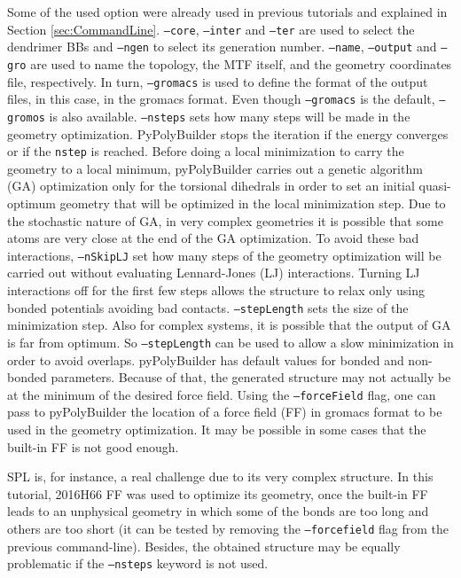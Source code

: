 Some of the used option were already used in previous tutorials and explained in Section \ref{sec:CommandLine}.
\texttt{--core}, \texttt{--inter} and \texttt{--ter} are used to select the dendrimer BBs and \texttt{--ngen} to select its generation number.
\texttt{--name}, \texttt{--output} and \texttt{--gro} are used to name the topology, the MTF itself, and the geometry coordinates file, respectively.
In turn, \texttt{--gromacs} is used to define the format of the output files, in this case, in the gromacs format.
Even though \texttt{--gromacs} is the default, \texttt{--gromos} is also available.
\texttt{--nsteps} sets how many steps will be made in the geometry optimization.
PyPolyBuilder stops the iteration if the energy converges or if the \texttt{nstep} is reached.
Before doing a local minimization to carry the geometry to a local minimum, pyPolyBuilder carries out a genetic algorithm (GA) optimization only for the torsional dihedrals in order to set an initial quasi-optimum geometry that will be optimized in the local minimization step.
Due to the stochastic nature of GA, in very complex geometries it is possible that some atoms are very close at the end of the GA optimization.
To avoid these bad interactions, \texttt{--nSkipLJ} set how many steps of the geometry optimization will be carried out without evaluating Lennard-Jones (LJ) interactions.
Turning LJ interactions off for the first few steps allows the structure to relax only using bonded potentials avoiding bad contacts.
\texttt{--stepLength} sets the size of the minimization step.
Also for complex systems, it is possible that the output of GA is far from optimum.
So \texttt{--stepLength} can be used to allow a slow minimization in order to avoid overlaps.
pyPolyBuilder has default values for bonded and non-bonded parameters.
Because of that, the generated structure may not actually be at the minimum of the desired force field.
Using the \texttt{--forceField} flag, one can pass to pyPolyBuilder the location of a force field (FF) in gromacs format to be used in the geometry optimization. 
It may be possible in some cases that the built-in FF is not good enough.

SPL is, for instance, a real challenge due to its very complex structure.
In this tutorial, 2016H66 FF was used to optimize its geometry, once the built-in FF leads to an unphysical geometry in which some of the bonds are too long and others are too short (it can be tested by removing the \texttt{--forcefield} flag from the previous command-line).
Besides, the obtained structure may be equally problematic if the \texttt{--nsteps} keyword is not used.


